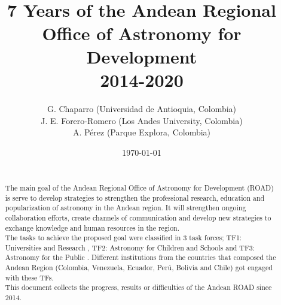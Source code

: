 \documentclass[paper=a4, fontsize=11pt]{scrartcl} %
\title{	
\normalfont \normalsize 
\textsc{} \\ [25pt] %
\horrule{0.5pt} \\[0.4cm] %
\huge  7 Years of the Andean Regional Office of Astronomy for Development\\ 2014-2020 %
\horrule{2pt} \\[0.5cm] %
}
\author{G. Chaparro (Universidad de Antioquia, Colombia)\\
J. E. Forero-Romero (Los Andes University, Colombia)\\
A. P\'erez (Parque Explora, Colombia)} %
\date{\normalsize\today} %
\numberwithin{equation}{section} %
\numberwithin{figure}{section} %
\numberwithin{table}{section} %
\begin{document}
\maketitle %

\newpage
\begin{abstract}

{ }\\

The main goal of the Andean Regional Office of Astronomy for Development (ROAD) is serve to develop strategies to strengthen the professional research, education and popularization of astronomy in the Andean region. It will strengthen ongoing collaboration efforts, create channels of communication and develop new strategies to exchange knowledge and human resources in the region.
\\

The tasks to achieve the proposed goal were classified in 3 task forces; TF1: Universities and Research , TF2: Astronomy for Children and Schools and TF3: Astronomy for the Public . Different institutions from the countries that composed the Andean Region (Colombia, Venezuela, Ecuador, Perú, Bolivia and Chile) got engaged with these TFs.
\\

This document collects the progress, results or difficulties of the Andean ROAD since 2014. 

\end{abstract}

\newpage
\tableofcontents










%


%
%
\end{document}

